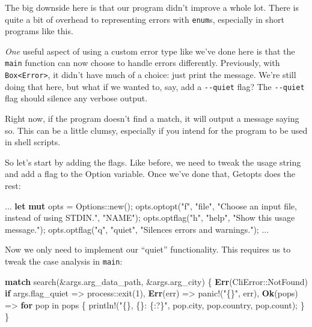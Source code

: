 \documentclass[a4paper,]{book}
\newenvironment{Shaded}{\begin{snugshade}}{\end{snugshade}}
\newcommand{\KeywordTok}[1]{\textcolor[rgb]{0.13,0.29,0.53}{\textbf{{#1}}}}
\newcommand{\DecValTok}[1]{\textcolor[rgb]{0.00,0.00,0.81}{{#1}}}
\newcommand{\StringTok}[1]{\textcolor[rgb]{0.31,0.60,0.02}{{#1}}}
\newcommand{\OtherTok}[1]{\textcolor[rgb]{0.56,0.35,0.01}{{#1}}}
\newcommand{\NormalTok}[1]{{#1}}
\begin{document}
The big downside here is that our program didn't improve a whole lot.
There is quite a bit of overhead to representing errors with
\texttt{enum}s, especially in short programs like this.

\emph{One} useful aspect of using a custom error type like we've done
here is that the \texttt{main} function can now choose to handle errors
differently. Previously, with
\texttt{Box\textless{}Error\textgreater{}}, it didn't have much of a
choice: just print the message. We're still doing that here, but what if
we wanted to, say, add a \texttt{-\/-quiet} flag? The \texttt{-\/-quiet}
flag should silence any verbose output.

Right now, if the program doesn't find a match, it will output a message
saying so. This can be a little clumsy, especially if you intend for the
program to be used in shell scripts.

So let's start by adding the flags. Like before, we need to tweak the
usage string and add a flag to the Option variable. Once we've done
that, Getopts does the rest:

\begin{Shaded}
\begin{Highlighting}[]
\NormalTok{...}
\KeywordTok{let} \KeywordTok{mut} \NormalTok{opts = Options::new();}
\NormalTok{opts.optopt(}\StringTok{"f"}\NormalTok{, }\StringTok{"file"}\NormalTok{, }\StringTok{"Choose an input file, instead of using STDIN."}\NormalTok{, }\StringTok{"NAME"}\NormalTok{);}
\NormalTok{opts.optflag(}\StringTok{"h"}\NormalTok{, }\StringTok{"help"}\NormalTok{, }\StringTok{"Show this usage message."}\NormalTok{);}
\NormalTok{opts.optflag(}\StringTok{"q"}\NormalTok{, }\StringTok{"quiet"}\NormalTok{, }\StringTok{"Silences errors and warnings."}\NormalTok{);}
\NormalTok{...}
\end{Highlighting}
\end{Shaded}

Now we only need to implement our ``quiet'' functionality. This requires
us to tweak the case analysis in \texttt{main}:

\begin{Shaded}
\begin{Highlighting}[]
\KeywordTok{match} \NormalTok{search(&args.arg_data_path, &args.arg_city) \{}
    \KeywordTok{Err}\NormalTok{(CliError::NotFound) }\KeywordTok{if} \NormalTok{args.flag_quiet => process::exit(}\DecValTok{1}\NormalTok{),}
    \KeywordTok{Err}\NormalTok{(err) => }\OtherTok{panic!}\NormalTok{(}\StringTok{"\{\}"}\NormalTok{, err),}
    \KeywordTok{Ok}\NormalTok{(pops) => }\KeywordTok{for} \NormalTok{pop in pops \{}
        \OtherTok{println!}\NormalTok{(}\StringTok{"\{\}, \{\}: \{:?\}"}\NormalTok{, pop.city, pop.country, pop.count);}
    \NormalTok{\}}
\NormalTok{\}}
\end{Highlighting}
\end{Shaded}
\end{document}
